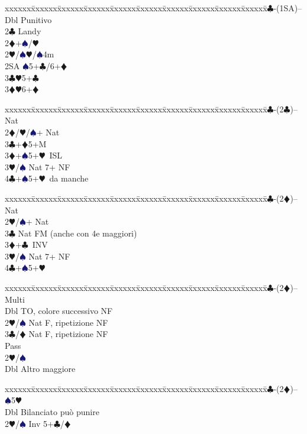 \documentclass[a4paper,italian]{article}
\newcommand{\BC}{\textcolor{OliveGreen}{$\clubsuit$}}
\newcommand{\BD}{\textcolor{RedOrange}{$\vardiamondsuit$}}
\newcommand{\BH}{\textcolor{Red2}{$\varheartsuit${}}}
\newcommand{\BS}{\textcolor{MidnightBlue}{$\spadesuit${}}}
\newenvironment{bidtable}
{\begin{tabbing}

    xxxxxx\=xxxxxx\=xxxxxx\=xxxxxx\=xxxxxx\=xxxxxx\=xxxxxx\=xxxxxx\=xxxxxx\=xxxxxx\=\kill}
{\end{tabbing} }%
\begin{document}
\begin{multicols}{2}
    \begin{bidtable}
        1\BC-(1SA)--\+\\
        Dbl \> Punitivo\\
        2\BC \> Landy\\
        2\BD {}+\BS /\BH \\
        2\BH/\BS {}\BH/\BS 4m\\
        2SA \BS 5+\BC /6+\BD \\
        3\BC {}\BH 5+\BC \\
        3\BD {}\BH 6+\BD \-
    \end{bidtable}
    \bigbreak
    \begin{bidtable}
        1\BC-(2\BC)-- \> \> Nat\+\\
        2\BD/\BH/\BS {}+ Nat\\
        3\BC {}+\BD 5+M\\
        3\BD {}+\BS 5+\BH\ ISL\\
        3\BH/\BS \> Nat 7+ NF\\
        4\BC {}+\BS 5+\BH\ da manche\-
    \end{bidtable}
    \bigbreak
    \begin{bidtable}
        1\BC-(2\BD)-- \> \> Nat\+\\
        2\BH/\BS {}+ Nat\\
        3\BC \> Nat FM (anche con 4e maggiori)\\
        3\BD {}+\BC\ INV\\
        3\BH/\BS \> Nat 7+ NF\\
        4\BC {}+\BS 5+\BH \-
    \end{bidtable}
    \vfill\null
    \columnbreak
    \begin{bidtable}
        1\BC-(2\BD)-- \> \> Multi\+\\
        Dbl \> TO, colore successivo NF\\
        2\BH/\BS \> Nat F, ripetizione NF\\
        3\BC/\BD \> Nat F, ripetizione NF\\
        Pass\+\\
        2\BH/\BS\+\\
        Dbl \> Altro maggiore\-\-\-
    \end{bidtable}
    \begin{bidtable}
        1\BC-(2\BD)-- \> \BS 5\BH \+\\
        Dbl \> Bilanciato può punire\\
        2\BH/\BS \> Inv 5+\BC /\BD \\

\end{bidtable}
\end{multicols}
\end{document}
